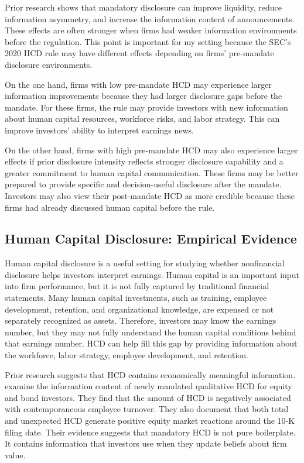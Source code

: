 \documentclass[12pt]{article}
\begin{document}
Prior research shows that mandatory disclosure can improve liquidity, reduce information asymmetry, and increase the information content of announcements. These effects are often stronger when firms had weaker information environments before the regulation. This point is important for my setting because the SEC's 2020 HCD rule may have different effects depending on firms' pre-mandate disclosure environments.

On the one hand, firms with low pre-mandate HCD may experience larger information improvements because they had larger disclosure gaps before the mandate. For these firms, the rule may provide investors with new information about human capital resources, workforce risks, and labor strategy. This can improve investors' ability to interpret earnings news.

On the other hand, firms with high pre-mandate HCD may also experience larger effects if prior disclosure intensity reflects stronger disclosure capability and a greater commitment to human capital communication. These firms may be better prepared to provide specific and decision-useful disclosure after the mandate. Investors may also view their post-mandate HCD as more credible because these firms had already discussed human capital before the rule.

\subsection{Human Capital Disclosure: Empirical Evidence}

Human capital disclosure is a useful setting for studying whether nonfinancial disclosure helps investors interpret earnings. Human capital is an important input into firm performance, but it is not fully captured by traditional financial statements. Many human capital investments, such as training, employee development, retention, and organizational knowledge, are expensed or not separately recognized as assets. Therefore, investors may know the earnings number, but they may not fully understand the human capital conditions behind that earnings number. HCD can help fill this gap by providing information about the workforce, labor strategy, employee development, and retention.

Prior research suggests that HCD contains economically meaningful information. \citet{arif_al2022} examine the information content of newly mandated qualitative HCD for equity and bond investors. They find that the amount of HCD is negatively associated with contemporaneous employee turnover. They also document that both total and unexpected HCD generate positive equity market reactions around the 10-K filing date. Their evidence suggests that mandatory HCD is not pure boilerplate. It contains information that investors use when they update beliefs about firm value.
\end{document}
